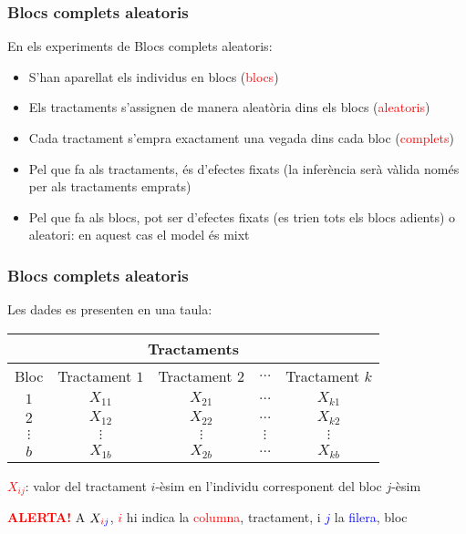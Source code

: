 \documentclass[12pt,t]{beamer}
\newcommand{\red}[1]{\textcolor{red}{#1}}
\newcommand{\blue}[1]{\textcolor{blue}{#1}}
\renewcommand{\emph}[1]{{\color{red}#1}}
\theoremstyle{plain}
\theoremstyle{definition}
\begin{document}
\begin{frame}
\frametitle{Blocs complets aleatoris}


En els experiments de \emph{Blocs complets aleatoris}:
\medskip

\begin{itemize}
\item S'han aparellat els individus en blocs  (\red{blocs})
\medskip

\item Els tractaments s'assignen de manera aleatòria dins els blocs  (\red{aleatoris})
\medskip

\item Cada tractament s'empra exactament una vegada dins cada bloc (\red{complets})
\medskip

\item Pel que fa als tractaments, és d'\emph{efectes fixats}  (la inferència serà vàlida només per als 
tractaments emprats)
\medskip

\item Pel que fa als blocs, pot ser d'\emph{efectes fixats}  (es trien tots els blocs adients) o \emph{aleatori}: en aquest cas el model és \emph{mixt}

\end{itemize}
\end{frame}


\begin{frame}
\frametitle{Blocs complets aleatoris}

Les dades es presenten en una taula:
{\small \begin{center}
\begin{tabular}{c|cccc}
\hline
\multicolumn{5}{c}{\hphantom{Blocs} Tractaments}\\\hline Bloc & Tractament $1$&Tractament
$2$&$\ldots$&Tractament $k$\\\hline
$1$&$X_{11}$&$X_{21}$&$\ldots$&$X_{k1}$\\
$2$&$X_{12}$&$X_{22}$&$\ldots$&$X_{k2}$\\
$\vdots$&$\vdots$&$\vdots$&$\vdots$&$\vdots$\\
$b$&$X_{1b}$&$X_{2b}$&$\ldots$&$X_{kb}$\\\hline
\end{tabular}
\end{center}

}
\medskip

\red{$X_{ij}$}: valor del tractament $i$-èsim en l'individu corresponent del bloc $j$-èsim 
\medskip

\red{\bf ALERTA!} A $X_{\red{i}\blue{j}}$, \red{$i$} hi indica la \red{columna}, tractament, i \blue{$j$} la \blue{filera}, bloc


\end{frame}
\end{document}

